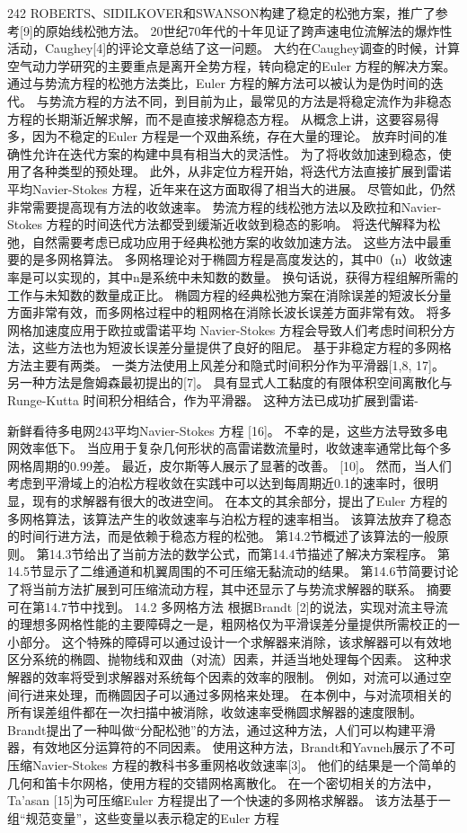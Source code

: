 \documentclass[UTF8,11pt,a4paper,openany,fontset=fandol]{ctexbook}
\begin{document}
242 ROBERTS、SIDILKOVER和SWANSON构建了稳定的松弛方案，推广了参考[9]的原始线松弛方法。 20世纪70年代的十年见证了跨声速电位流解法的爆炸性活动，Caughey[4]的评论文章总结了这一问题。 大约在Caughey调查的时候，计算空气动力学研究的主要重点是离开全势方程，转向稳定的Euler 方程的解决方案。 通过与势流方程的松弛方法类比，Euler 方程的解方法可以被认为是伪时间的迭代。 与势流方程的方法不同，到目前为止，最常见的方法是将稳定流作为非稳态方程的长期渐近解求解，而不是直接求解稳态方程。 从概念上讲，这要容易得多，因为不稳定的Euler 方程是一个双曲系统，存在大量的理论。 放弃时间的准确性允许在迭代方案的构建中具有相当大的灵活性。 为了将收敛加速到稳态，使用了各种类型的预处理。 此外，从非定位方程开始，将迭代方法直接扩展到雷诺平均Navier-Stokes 方程，近年来在这方面取得了相当大的进展。 尽管如此，仍然非常需要提高现有方法的收敛速率。 势流方程的线松弛方法以及欧拉和Navier-Stokes 方程的时间迭代方法都受到缓渐近收敛到稳态的影响。 将迭代解释为松弛，自然需要考虑已成功应用于经典松弛方案的收敛加速方法。 这些方法中最重要的是多网格算法。 多网格理论对于椭圆方程是高度发达的，其中0（n）收敛速率是可以实现的，其中n是系统中未知数的数量。 换句话说，获得方程组解所需的工作与未知数的数量成正比。 椭圆方程的经典松弛方案在消除误差的短波长分量方面非常有效，而多网格过程中的粗网格在消除长波长误差方面非常有效。 将多网格加速度应用于欧拉或雷诺平均 Navier-Stokes 方程会导致人们考虑时间积分方法，这些方法也为短波长误差分量提供了良好的阻尼。 基于非稳定方程的多网格方法主要有两类。 一类方法使用上风差分和隐式时间积分作为平滑器[1,8, 17]。 另一种方法是詹姆森最初提出的[7]。 具有显式人工黏度的有限体积空间离散化与Runge-Kutta 时间积分相结合，作为平滑器。 这种方法已成功扩展到雷诺-

新鲜看待多电网243平均Navier-Stokes 方程 [16]。 不幸的是，这些方法导致多电网效率低下。 当应用于复杂几何形状的高雷诺数流量时，收敛速率通常比每个多网格周期的0.99差。 最近，皮尔斯等人展示了显著的改善。 [10]。 然而，当人们考虑到平滑域上的泊松方程收敛在实践中可以达到每周期近0.1的速率时，很明显，现有的求解器有很大的改进空间。 在本文的其余部分，提出了Euler 方程的多网格算法，该算法产生的收敛速率与泊松方程的速率相当。 该算法放弃了稳态的时间行进方法，而是依赖于稳态方程的松弛。 第14.2节概述了该算法的一般原则。 第14.3节给出了当前方法的数学公式，而第14.4节描述了解决方案程序。 第14.5节显示了二维通道和机翼周围的不可压缩无黏流动的结果。 第14.6节简要讨论了将当前方法扩展到可压缩流动方程，其中还显示了与势流求解器的联系。 摘要可在第14.7节中找到。 14.2 多网格方法 根据Brandt [2]的说法，实现对流主导流的理想多网格性能的主要障碍之一是，粗网格仅为平滑误差分量提供所需校正的一小部分。 这个特殊的障碍可以通过设计一个求解器来消除，该求解器可以有效地区分系统的椭圆、抛物线和双曲（对流）因素，并适当地处理每个因素。 这种求解器的效率将受到求解器对系统每个因素的效率的限制。 例如，对流可以通过空间行进来处理，而椭圆因子可以通过多网格来处理。 在本例中，与对流项相关的所有误差组件都在一次扫描中被消除，收敛速率受椭圆求解器的速度限制。 Brandt提出了一种叫做“分配松弛”的方法，通过这种方法，人们可以构建平滑器，有效地区分运算符的不同因素。 使用这种方法，Brandt和Yavneh展示了不可压缩Navier-Stokes 方程的教科书多重网格收敛速率[3]。 他们的结果是一个简单的几何和笛卡尔网格，使用方程的交错网格离散化。 在一个密切相关的方法中，Ta'asan [15]为可压缩Euler 方程提出了一个快速的多网格求解器。 该方法基于一组“规范变量”，这些变量以表示稳定的Euler 方程
\end{document}
